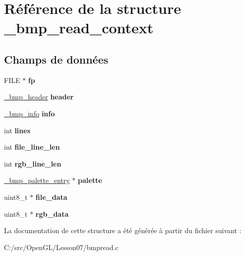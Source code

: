 \hypertarget{struct__bmp__read__context}{}\section{Référence de la structure \+\_\+bmp\+\_\+read\+\_\+context}
\label{struct__bmp__read__context}
\subsection*{Champs de données}
\begin{DoxyCompactItemize}
\item 
\hypertarget{struct__bmp__read__context_aa065f30aa9f5f9a42132c82c787ee70b}{}F\+I\+L\+E $\ast$ {\bfseries fp}\label{struct__bmp__read__context_aa065f30aa9f5f9a42132c82c787ee70b}

\item 
\hypertarget{struct__bmp__read__context_a9856b3dbbb54a12fd9be485a95b97d72}{}\hyperlink{struct__bmp__header}{\+\_\+bmp\+\_\+header} {\bfseries header}\label{struct__bmp__read__context_a9856b3dbbb54a12fd9be485a95b97d72}

\item 
\hypertarget{struct__bmp__read__context_aa55dff8fa952fae12b7abff2e55b6d4e}{}\hyperlink{struct__bmp__info}{\+\_\+bmp\+\_\+info} {\bfseries info}\label{struct__bmp__read__context_aa55dff8fa952fae12b7abff2e55b6d4e}

\item 
\hypertarget{struct__bmp__read__context_a9921ae02cadccc99dd6c3a9b68be050a}{}int {\bfseries lines}\label{struct__bmp__read__context_a9921ae02cadccc99dd6c3a9b68be050a}

\item 
\hypertarget{struct__bmp__read__context_a1da859186ff22dd14e38ee25bba502f6}{}int {\bfseries file\+\_\+line\+\_\+len}\label{struct__bmp__read__context_a1da859186ff22dd14e38ee25bba502f6}

\item 
\hypertarget{struct__bmp__read__context_acc538cfd03541cb1f68abd7b66f52010}{}int {\bfseries rgb\+\_\+line\+\_\+len}\label{struct__bmp__read__context_acc538cfd03541cb1f68abd7b66f52010}

\item 
\hypertarget{struct__bmp__read__context_a14ae091ac5395ea2ef8065668aed04b9}{}\hyperlink{struct__bmp__palette__entry}{\+\_\+bmp\+\_\+palette\+\_\+entry} $\ast$ {\bfseries palette}\label{struct__bmp__read__context_a14ae091ac5395ea2ef8065668aed04b9}

\item 
\hypertarget{struct__bmp__read__context_a3d3dcb5bf27633452fb0640f30f27eb7}{}uint8\+\_\+t $\ast$ {\bfseries file\+\_\+data}\label{struct__bmp__read__context_a3d3dcb5bf27633452fb0640f30f27eb7}

\item 
\hypertarget{struct__bmp__read__context_a65651c434db5f56bd596b27107f9cd64}{}uint8\+\_\+t $\ast$ {\bfseries rgb\+\_\+data}\label{struct__bmp__read__context_a65651c434db5f56bd596b27107f9cd64}

\end{DoxyCompactItemize}


La documentation de cette structure a été générée à partir du fichier suivant \+:\begin{DoxyCompactItemize}
\item 
C\+:/src/\+Open\+G\+L/\+Lesson07/bmpread.\+c\end{DoxyCompactItemize}
